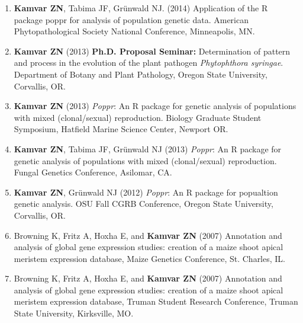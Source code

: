\begin{enumerate}[leftmargin = 14pt]
	\vspace{3pt}

	\item \textbf{Kamvar ZN}, Tabima JF, Gr\"unwald NJ. (2014) Application of
	the R package poppr for analysis of population genetic data. American
	Phytopathological Society National Conference, Minneapolis, MN.

	\vspace{3pt}

	\item \textbf{Kamvar ZN} (2013) \textbf{Ph.D. Proposal Seminar:} Determination of
	pattern and process in the evolution of the plant pathogen
	\textit{Phytophthora syringae}. Department of Botany and Plant Pathology,
	Oregon State University, Corvallis, OR.

	\vspace{3pt}

	\item \textbf{Kamvar ZN} (2013) \textit{Poppr}: An R package for genetic
	analysis of populations with mixed (clonal/sexual) reproduction. Biology
	Graduate Student Symposium, Hatfield Marine Science Center, Newport OR.

	\vspace{3pt}

	\item \textbf{Kamvar ZN}, Tabima JF, Gr\"unwald NJ (2013) \textit{Poppr}: An
	R package for genetic analysis of populations with mixed (clonal/sexual)
	reproduction. Fungal Genetics Conference, Asilomar, CA.

	\vspace{3pt}

	\item \textbf{Kamvar ZN}, Gr\"unwald NJ (2012) \textit{Poppr}: An R package
	for popualtion genetic analysis. OSU Fall CGRB Conference, Oregon State
	University, Corvallis, OR.

	\vspace{3pt}

	\item Browning K, Fritz A, Hoxha E, and \textbf{Kamvar ZN} (2007) Annotation
	and analysis of global gene expression studies: creation of a maize shoot
	apical meristem expression database, Maize Genetics Conference, St. Charles,
	IL.

	\vspace{3pt}

	\item Browning K, Fritz A, Hoxha E, and \textbf{Kamvar ZN} (2007) Annotation
	and analysis of global gene expression studies: creation of a maize shoot
	apical meristem expression database, Truman Student Research Conference,
	Truman State University, Kirksville, MO.

\end{enumerate}

